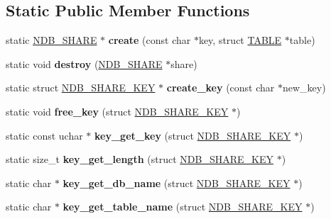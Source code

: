 \subsection*{Static Public Member Functions}
\begin{DoxyCompactItemize}
\item 
\mbox{\label{structNDB__SHARE_a6d68232fb52d5f46230c31ad38619823}} 
static \mbox{\hyperlink{structNDB__SHARE}{N\+D\+B\+\_\+\+S\+H\+A\+RE}} $\ast$ {\bfseries create} (const char $\ast$key, struct \mbox{\hyperlink{structTABLE}{T\+A\+B\+LE}} $\ast$table)
\item 
\mbox{\label{structNDB__SHARE_adf1ce1d3c4b6dceb3e01fbf30fbb1747}} 
static void {\bfseries destroy} (\mbox{\hyperlink{structNDB__SHARE}{N\+D\+B\+\_\+\+S\+H\+A\+RE}} $\ast$share)
\item 
\mbox{\label{structNDB__SHARE_ab0c6d58965ac8e47b0d79e06fa7dd3ea}} 
static struct \mbox{\hyperlink{structNDB__SHARE__KEY}{N\+D\+B\+\_\+\+S\+H\+A\+R\+E\+\_\+\+K\+EY}} $\ast$ {\bfseries create\+\_\+key} (const char $\ast$new\+\_\+key)
\item 
\mbox{\label{structNDB__SHARE_a431ead0f94931272df94e7435f8df071}} 
static void {\bfseries free\+\_\+key} (struct \mbox{\hyperlink{structNDB__SHARE__KEY}{N\+D\+B\+\_\+\+S\+H\+A\+R\+E\+\_\+\+K\+EY}} $\ast$)
\item 
\mbox{\label{structNDB__SHARE_a2e68a131a646de5258a9141f53aa1683}} 
static const uchar $\ast$ {\bfseries key\+\_\+get\+\_\+key} (struct \mbox{\hyperlink{structNDB__SHARE__KEY}{N\+D\+B\+\_\+\+S\+H\+A\+R\+E\+\_\+\+K\+EY}} $\ast$)
\item 
\mbox{\label{structNDB__SHARE_ae4974486d3111210066b7dd78212bf97}} 
static size\+\_\+t {\bfseries key\+\_\+get\+\_\+length} (struct \mbox{\hyperlink{structNDB__SHARE__KEY}{N\+D\+B\+\_\+\+S\+H\+A\+R\+E\+\_\+\+K\+EY}} $\ast$)
\item 
\mbox{\label{structNDB__SHARE_afacde36fde1e91db36b10e513c95a343}} 
static char $\ast$ {\bfseries key\+\_\+get\+\_\+db\+\_\+name} (struct \mbox{\hyperlink{structNDB__SHARE__KEY}{N\+D\+B\+\_\+\+S\+H\+A\+R\+E\+\_\+\+K\+EY}} $\ast$)
\item 
\mbox{\label{structNDB__SHARE_ad1c67d7aa64a4e29cc63b6c1f9903ac5}} 
static char $\ast$ {\bfseries key\+\_\+get\+\_\+table\+\_\+name} (struct \mbox{\hyperlink{structNDB__SHARE__KEY}{N\+D\+B\+\_\+\+S\+H\+A\+R\+E\+\_\+\+K\+EY}} $\ast$)
\end{DoxyCompactItemize}
